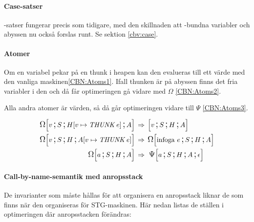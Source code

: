 \documentclass[../Optimise]{subfiles}
\begin{document}
\paragraph{Case-satser}
-satser fungerar precis som tidigare, med den skillnaden att -bundna variabler 
och abyssen nu också forslas runt. Se sektion \ref{cbv:case}.

\paragraph{Atomer}
Om en variabel pekar på en thunk i heapen kan den evalueras till ett
värde med den vanliga maskinen\eqref{CBN:Atoms1}. Ifall thunken är på abyssen
finns det fria variabler i den och då får optimeringen gå vidare med $\Omega$ \eqref{CBN:Atoms2}.

Alla andra atomer är värden, så då går optimeringen vidare till $\Psi$ \eqref{CBN:Atoms3}.

\begin{align}
\label{CBN:Atoms1}\CBNOMEGA S{\heap v{\THUNK e}}Av &\rulesep \CBNMC vSHA\\
\label{CBN:Atoms2}\CBNOMEGA SH{\abyss v{\THUNK e}}v  &\rulesep \CBNOMEGA SHA{\text{infoga }e}\\
\label{CBN:Atoms3}\CBNOMEGA SHAa &\rulesep \, \CBNPSI SHA{\epsilon}a
\end{align}


\paragraph{Call-by-name-semantik med anropsstack}
\label{sec:CBN:Callstack}


De invarianter som måste hållas för att organisera en anropsstack liknar de som finns
när den organiseras för STG-maskinen. Här nedan listas de ställen i optimeringen där anropsstacken förändras:
\end{document}
